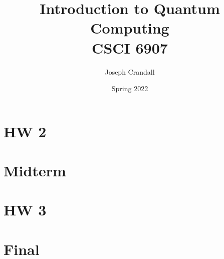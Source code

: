 
\usepackage{algorithm, algpseudocode, color, gensymb, siunitx, soul, subfiles}
\usepackage[a4paper, total={7.5in, 10in}]{geometry}

\title{Introduction to Quantum Computing\\
\large CSCI 6907}
\author{Joseph Crandall}
\date{Spring 2022}


\maketitle

\section{HW 2}


\section{Midterm}


\section{HW 3}


\section{Final}



